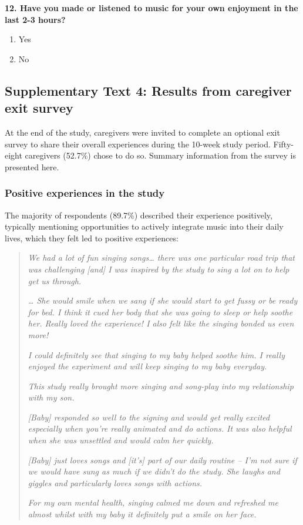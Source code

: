 \documentclass[
]{article}
\providecommand{\tightlist}{%
  \setlength{\itemsep}{0pt}\setlength{\parskip}{0pt}}
\begin{document}
\textbf{12. Have you made or listened to music for your own enjoyment in
the last 2-3 hours?}

\begin{enumerate}
\def\labelenumi{\alph{enumi}.}
\tightlist
\item
  Yes
\item
  No
\end{enumerate}

\subsection*{Supplementary Text 4: Results from caregiver exit
survey}\label{supplementary-text-4-results-from-caregiver-exit-survey}

At the end of the study, caregivers were invited to complete an optional
exit survey to share their overall experiences during the 10-week study
period. Fifty-eight caregivers (52.7\%) chose to do so. Summary
information from the survey is presented here.

\subsubsection*{Positive experiences in the
study}\label{positive-experiences-in-the-study}

The majority of respondents (89.7\%) described their experience
positively, typically mentioning opportunities to actively integrate
music into their daily lives, which they felt led to positive
experiences:

\begin{quote}
\textit{We had a lot of fun singing songs… there was one particular road trip that was challenging [and] I was inspired by the study to sing a lot on to help get us through.}
  
\textit{… She would smile when we sang if she would start to get fussy or be ready for bed. I think it cued her body that she was going to sleep or help soothe her. Really loved the experience! I also felt like the singing bonded us even more!}
  
\textit{I could definitely see that singing to my baby helped soothe him. I really enjoyed the experiment and will keep singing to my baby everyday.}
  
\textit{This study really brought more singing and song-play into my relationship with my son.}
  
\textit{[Baby] responded so well to the signing and would get really excited especially when you're really animated and do actions. It was also helpful when she was unsettled and would calm her quickly.}
  
\textit{[Baby] just loves songs and [it’s] part of our daily routine – I’m not sure if we would have sung as much if we didn’t do the study. She laughs and giggles and particularly loves songs with actions.}
  
\textit{For my own mental health, singing calmed me down and refreshed me almost whilst with my baby it definitely put a smile on her face.}
\end{quote}
\end{document}
